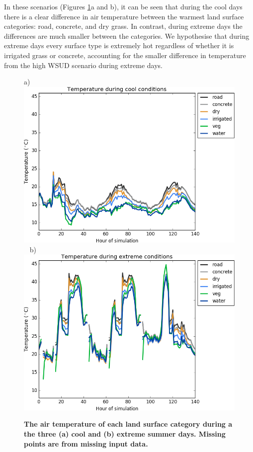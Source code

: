 \documentclass[final,3p,times,authoryear]{elsarticle}
\begin{document}
In these scenarios (Figures \ref{fig:surface_air_temps}a and b), it can be seen that during the cool days there is a clear difference in air temperature between the warmest land surface categories: road, concrete, and dry grass. In contrast, during extreme days the differences are much smaller between the categories. We hypothesise that during extreme days every surface type is extremely hot regardless of whether it is irrigated grass or concrete, accounting for the smaller difference in temperature from the high WSUD scenario during extreme days.


\begin{figure}[!htbp]
\centering   
a)\includegraphics[scale=0.40]{images/fig1a}
~
b)\includegraphics[scale=0.40]{images/fig1b} 
\caption{\bf The air temperature of each land surface category during a the three (a) cool and (b) extreme summer days. Missing points are from missing input data.}    
 \label{fig:surface_air_temps} 
\end{figure} 
\end{document}
